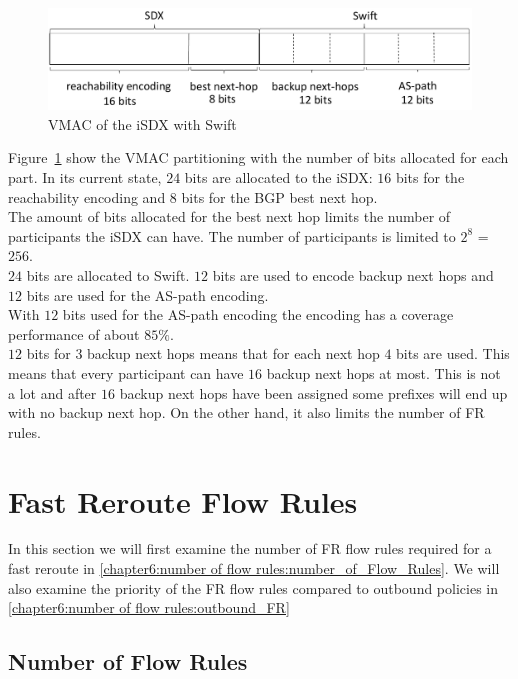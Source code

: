 \begin{figure}[h]
\center
\includegraphics[scale = 0.65]{Figures/eval_vmac_cropped2.pdf}
\caption{VMAC of the iSDX with Swift}
\label{fig:discussion_VMAC}
\end{figure}

Figure~\ref{fig:discussion_VMAC} show the VMAC partitioning with the number of bits allocated for each part. 
In its current state, $24$ bits are allocated to the iSDX: $16$ bits for the reachability encoding and $8$ bits for the BGP best next hop. \\
The amount of bits allocated for the best next hop limits the number of participants the iSDX can have. The number of participants is limited to $2^8$ = $256$. \\
$24$ bits are allocated to Swift. $12$ bits are used to encode backup next hops and $12$ bits are used for the AS-path encoding. \\
With $12$ bits used for the AS-path encoding the encoding has a coverage performance of about $85\%$. \cite{swift}\\
$12$ bits for $3$ backup next hops means that for each next hop $4$ bits are used. This means that every participant can have $16$ backup next hops at most. This is not a lot and after $16$ backup next hops have been assigned some prefixes will end up with no backup next hop. On the other hand, it also limits the number of FR rules. \\

\section{\label{chapter6:number of flow rules}Fast Reroute Flow Rules}

In this section we will first examine the number of FR flow rules required for a fast reroute in \ref{chapter6:number of flow rules:number_of_Flow_Rules}. We will also examine the priority of the FR flow rules compared to outbound policies in \ref{chapter6:number of flow rules:outbound_FR}

\subsection{\label{chapter6:number of flow rules:number_of_Flow_Rules}Number of Flow Rules}

